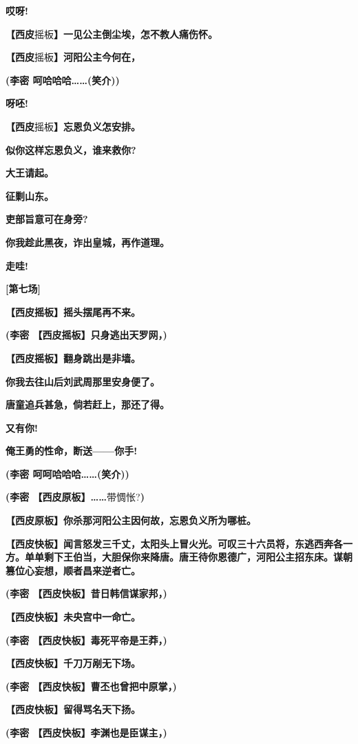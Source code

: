 \textbf{哎呀!}

\textbf{【西皮}摇板\textbf{】一见公主倒尘埃，怎不教人痛伤怀。}

\textbf{【西皮}摇板\textbf{】河阳公主今何在，}

\textbf{(李密 呵哈哈哈\ldots{}\ldots{}(笑介))}

\textbf{呀呸!}

\textbf{【西皮}摇板\textbf{】忘恩负义怎安排。}

\textbf{似你这样忘恩负义，谁来救你?}

\textbf{大王请起。}

\textbf{征剿山东。}

\textbf{吏部旨意可在身旁?}

\textbf{你我趁此黑夜，诈出皇城，再作道理。}

\textbf{走哇!}

\textbf{{[}第七场{]}}

\textbf{【西皮摇板】摇头摆尾再不来。}

\textbf{(李密 【西皮摇板】只身逃出天罗网，)}

\textbf{【西皮摇板】翻身跳出是非墙。}

\textbf{你我去往山后刘武周那里安身便了。}

\textbf{唐童追兵甚急，倘若赶上，那还了得。}

\textbf{又有你!}

\textbf{俺王勇的性命，断送------你手!}

\textbf{(李密 呵呵哈哈哈\ldots{}\ldots{}(笑介))}

\textbf{(李密 【西皮原板】\ldots{}\ldots{}}带惆怅?\textbf{)}

\textbf{【西皮原板】你杀那河阳公主因何故，忘恩负义所为哪桩。}

\textbf{【西皮快板】闻言怒发三千丈，太阳头上冒火光。可叹三十六员将，东逃西奔各一方。单单剩下王伯当，大胆保你来降唐。唐王待你恩德广，河阳公主招东床。谋朝篡位心妄想，顺者昌来逆者亡。}

\textbf{(李密 【西皮快板】昔日韩信谋家邦，)}

\textbf{【西皮快板】未央宫中一命亡。}

\textbf{(李密 【西皮快板】毒死平帝是王莽，)}

\textbf{【西皮快板】千刀万剐无下场。}

\textbf{(李密 【西皮快板】曹丕也曾把中原掌，)}

\textbf{【西皮快板】留得骂名天下扬。}

\textbf{(李密 【西皮快板】李渊也是臣谋主，)}

